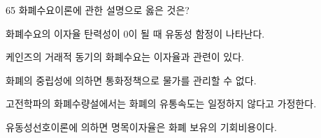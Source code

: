 \begin{question}{65}
화폐수요이론에 관한 설명으로 옳은 것은?
\begin{choices}
  \item 화폐수요의 이자율 탄력성이 0이 될 때 유동성 함정이 나타난다.
  \item 케인즈의 거래적 동기의 화폐수요는 이자율과 관련이 있다.
  \item 화폐의 중립성에 의하면 통화정책으로 물가를 관리할 수 없다.
  \item 고전학파의 화폐수량설에서는 화폐의 유통속도는 일정하지 않다고 가정한다.
  \item 유동성선호이론에 의하면 명목이자율은 화폐 보유의 기회비용이다.
\end{choices}
\end{question}
